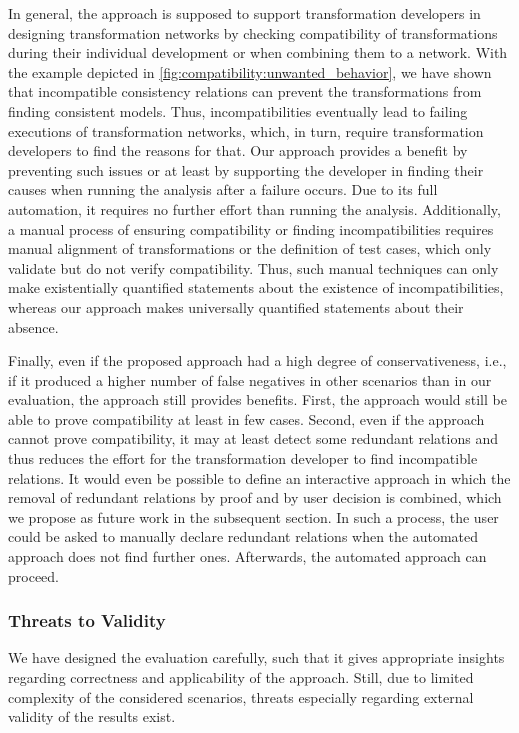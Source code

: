 In general, the approach is supposed to support transformation developers in designing transformation networks by checking compatibility of transformations during their individual development or when combining them to a network.
With the example depicted in \autoref{fig:compatibility:unwanted_behavior}, we have shown that incompatible consistency relations can prevent the transformations from finding consistent models.
Thus, incompatibilities eventually lead to failing executions of transformation networks, which, in turn, require transformation developers to find the reasons for that.
Our approach provides a benefit by preventing such issues or at least by supporting the developer in finding their causes when running the analysis after a failure occurs.
Due to its full automation, it requires no further effort than running the analysis.
Additionally, a manual process of ensuring compatibility or finding incompatibilities requires manual alignment of transformations or the definition of test cases, which only validate but do not verify compatibility.
Thus, such manual techniques can only make existentially quantified statements about the existence of incompatibilities, whereas our approach makes universally quantified statements about their absence.

Finally, even if the proposed approach had a high degree of conservativeness, i.e., if it produced a higher number of false negatives in other scenarios than in our evaluation, the approach still provides benefits.
First, the approach would still be able to prove compatibility at least in few cases.
Second, even if the approach cannot prove compatibility, it may at least detect some redundant relations and thus reduces the effort for the transformation developer to find incompatible relations.
It would even be possible to define an interactive approach in which the removal of redundant relations by proof and by user decision is combined, which we propose as future work in the subsequent section.
In such a process, the user could be asked to manually declare redundant relations when the automated approach does not find further ones.
Afterwards, the automated approach can proceed.


\subsubsection{Threats to Validity}

We have designed the evaluation carefully, such that it gives appropriate insights regarding correctness and applicability of the approach.
Still, due to limited complexity of the considered scenarios, threats especially regarding external validity of the results exist.

